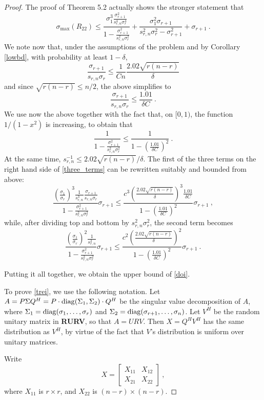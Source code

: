 \documentclass{article}
\newcommand{\diag}{{\rm diag}}
\theoremstyle{definition}
\newcommand{\smin}{s_{r,n}}
\begin{document}
\begin{proof}
The proof of Theorem 5.2 actually shows the stronger statement that 
\begin{equation} \label{three_terms}
\sigma_{\max}(R_{22}) \leq \frac{ \sigma_1^3 \frac{\sigma_{r+1}^2}{\smin^{4} \sigma_r^4}}{1 - \frac{\sigma_{r+1}^2}{\smin^2 \sigma_r^2}} + \frac{\sigma_1^2\sigma_{r+1}}{\smin^2\sigma_r^2 - \sigma_{r+1}^2} + \sigma_{r+1}~.
\end{equation}
We note now that, under the assumptions of the problem and by Corollary \ref{lowbd}, with probability at least $1-\delta$, 
\[
\frac{\sigma_{r+1}}{\smin \sigma_r} \leq \frac{1}{Cn} \frac{2.02 \sqrt{r(n-r)}}{\delta}
\] and since $\sqrt{r(n-r)} \leq n/2$, the above simplifies to
\[
\frac{\sigma_{r+1}}{\smin \sigma_r} \leq \frac{1.01}{\delta C}~.
\]
We use now the above together with the fact that, on $[0,1)$, the function $1/(1-x^2)$ is increasing, to obtain that
\[
\frac{1}{1 - \frac{\sigma_{r+1}^2}{\smin^2 \sigma_r^2}} \leq \frac{1}{1 - \left ( \frac{1.01}{\delta C} \right)^2}~.
\]
 At the same time, $\smin^{-1} \leq 2.02 \sqrt{r(n-r)}/\delta$. The first of the three terms on the right hand side of \eqref{three_terms} can be rewritten suitably and bounded from above:
\[
\frac{\left ( \frac{\sigma_1}{\sigma_r} \right)^3 \frac{1}{\smin^3}  \frac{\sigma_{r+1}}{\smin \sigma_r}}{ 1 - \frac{\sigma_{r+1}^2}{\smin^2 \sigma_r^2}} \sigma_{r+1} \leq \frac{c^3 \left ( \frac{2.02 \sqrt{r(n-r)}}{\delta} \right)^3 \frac{1.01}{\delta C}}{1 - \left ( \frac{1.01}{\delta C} \right)^2} \sigma_{r+1}~,
\]
while, after dividing top and bottom by $\smin^2 \sigma_{r}^2$, the second term becomes
\[
\frac{\left ( \frac{\sigma_1}{\sigma_r} \right)^2 \frac{1}{\smin^2}}{ 1 - \frac{\sigma_{r+1}^2}{\smin^2 \sigma_r^2}} \sigma_{r+1} \leq \frac{c^2 \left ( \frac{2.02 \sqrt{r(n-r)}}{\delta} \right)^2}{1 - \left ( \frac{1.01}{\delta C} \right)^2}\sigma_{r+1}~.
\]

 Putting it all together, we obtain the upper bound of \eqref{doi}.  

To prove \eqref{trei}, we use the following notation. Let $A = P \Sigma Q^{H} = P \cdot \diag(\Sigma_1, \Sigma_2) \cdot Q^{H}$ be the singular value decomposition of $A$, where $\Sigma_1 = \diag(\sigma_1, \ldots, \sigma_r)$ and $\Sigma_2 = \diag(\sigma_{r+1}, \ldots, \sigma_n)$. Let $V^H$ be the random unitary matrix in \textbf{RURV}, so that $A=URV$. Then $X = Q^{H}V^{H}$ has the same distribution as $V^{H}$, by virtue of the fact that $V$'s distribution is uniform over unitary matrices. 

Write 
\[
X = \left [ \begin{array}{cc} X_{11} & X_{12} \\ X_{21} & X_{22} \end{array} \right ]~,
\]
where $X_{11}$ is $r \times r$, and $X_{22}$ is $(n-r) \times (n-r)$. 


\end{proof}
\end{document}
